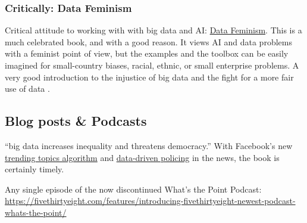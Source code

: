 \documentclass[
  fontsize=13pt,
  english,
  a4paper,
  openany, a4paper, oneside]{book}
\begin{document}
\hypertarget{critically-data-feminism}{%
\subsubsection{Critically: Data Feminism}\label{critically-data-feminism}}

Critical attitude to working with with big data and AI: \href{https://mitpressonpubpub.mitpress.mit.edu/data-feminism}{Data Feminism}. This is a much celebrated book, and with a good reason. It views AI and data problems with a feminist point of view, but the examples and the toolbox can be easily imagined for small-country biases, racial, ethnic, or small enterprise problems. A very good introduction to the injustice of big data and the fight for a more fair use of data \citep{data_feminism}.

\hypertarget{blogposts}{%
\subsection{Blog posts \& Podcasts}\label{blogposts}}

``big data increases inequality and threatens democracy.'' With Facebook's new \href{http://qz.com/769413/heres-how-facebooks-automated-trending-bar-probably-works/}{trending topics algorithm} and \href{https://medium.com/equal-future/predictive-policing-is-happening-now-and-police-could-learn-a-real-lesson-from-minority-report-e105a592eda0\#.h90q9xoqx}{data-driven policing} in the news, the book is certainly timely.

Any single episode of the now discontinued What's the Point Podcast: \url{https://fivethirtyeight.com/features/introducing-fivethirtyeight-newest-podcast-whats-the-point/}
\end{document}
